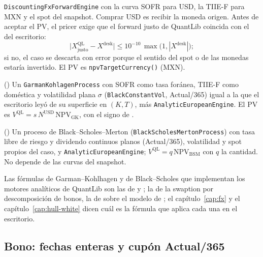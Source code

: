 \begin{description}
    \texttt{DiscountingFxForwardEngine} con la curva SOFR para USD, la TIIE-F para MXN y el spot del snapshot. Comprar USD es recibir
    la moneda origen. Antes de aceptar el PV, el pricer exige que el forward justo de QuantLib coincida con el del escritorio:
    \begin{equation}\label{eq:cap12-forward-justo}
      \bigl|X^{\mathrm{QL}}_{\mathrm{justo}} - X^{\mathrm{desk}}\bigr| \le 10^{-10}\,\max\bigl(1, |X^{\mathrm{desk}}|\bigr);
    \end{equation}
    si no, el caso se descarta con error porque el sentido del spot o de las monedas estaría invertido. El PV es
    \texttt{npvTargetCurrency()} (MXN).
  \item[\texttt{fx\_option}] () Un \texttt{GarmanKohlagenProcess} con SOFR como
    tasa foránea, TIIE-F como doméstica y volatilidad plana $\sigma$ (\texttt{BlackConstantVol}, Actual/365) igual a la que
    el escritorio leyó de su superficie en $(K, T)$, más \texttt{AnalyticEuropeanEngine}. El PV es
    $V^{\mathrm{QL}} = s\,N^{\mathrm{USD}}\,\mathrm{NPV}_{\mathrm{GK}}$, con el signo de .
  \item[\texttt{equity\_option}] () Un proceso de
    Black--Scholes--Merton (\texttt{Black\allowbreak Scholes\allowbreak Merton\allowbreak Process})
    con tasa libre de riesgo y dividendo continuos planos (Actual/365), volatilidad y spot propios del caso, y
    \texttt{AnalyticEuropeanEngine}; $V^{\mathrm{QL}} = q\,\mathrm{NPV}_{\mathrm{BSM}}$ con $q$ la cantidad. No depende de
    las curvas del snapshot.
\end{description}
Las fórmulas de Garman--Kohlhagen y de Black--Scholes que implementan los motores analíticos de QuantLib son las de
\citet{garman1983} y \citet{black1973}; la de la swaption por descomposición de bonos, la de \citet{jamshidian1989} sobre el
modelo de \citet{hull1990}; el capítulo~\ref{cap:fx} y el capítulo~\ref{cap:hull-white} dicen cuál es la fórmula
que aplica cada una en el escritorio.

\subsection{Bono: fechas enteras y cupón Actual/365}\label{sec:cap12-bono}


